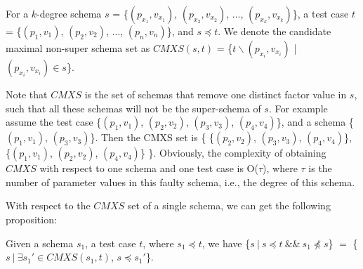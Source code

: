 \begin{definition}
For a $k$-degree schema $s$ = \{$(p_{x_{1}}, v_{x_{1}})$, $(p_{x_{2}}, v_{x_{2}})$, ..., $(p_{x_{k}}, v_{x_{k}})$\}, a test case $t$ = \{$(p_{1}, v_{1})$, $(p_{2}, v_{2})$, ..., $(p_{n}, v_{n})$\}, and $s \preceq t$. We denote the candidate maximal non-super schema set as $CMXS(s,t)$ = \{$t \backslash (p_{x_{i}}, v_{x_{i}})$ | $(p_{x_{i}}, v_{x_{i}}) \in s $\}.
\end{definition}

Note that $CMXS$ is the set of schemas that remove one distinct factor value in $s$, such that all these schemas will not be the super-schema of $s$. For example assume the test case \{$(p_{1}, v_{1})$, $(p_{2}, v_{2})$, $(p_{3}, v_{3})$, $(p_{4}, v_{4})$\}, and a schema \{$(p_{1}, v_{1})$, $(p_{3}, v_{3})$\}. Then the CMXS set is \{ \{$(p_{2}, v_{2})$,  $(p_{3}, v_{3})$, $(p_{4}, v_{4})$\}, \{$(p_{1}, v_{1})$,  $(p_{2}, v_{2})$, $(p_{4}, v_{4})$\} \}. Obviously, the complexity of obtaining $CMXS$ with respect to one schema and one test case is O($\tau$), where $\tau$ is the number of parameter values in this faulty schema, i.e., the degree of this schema.

With respect to the $CMXS$ set of a single schema, we can get the following proposition:


\begin{proposition}\label{pro:subofCMXS}
Given a schema $s_{1}$, a test case $t$, where $s_{1} \preceq t$, we have \{$s\ |\ s \preceq t\ \&\&\ s_{1} \npreceq s$\} $=$  \{$ s\ |\ \exists s_{1}' \in CMXS(s_{1}, t)$, $s \preceq s_{1}'$\}.
\end{proposition}


